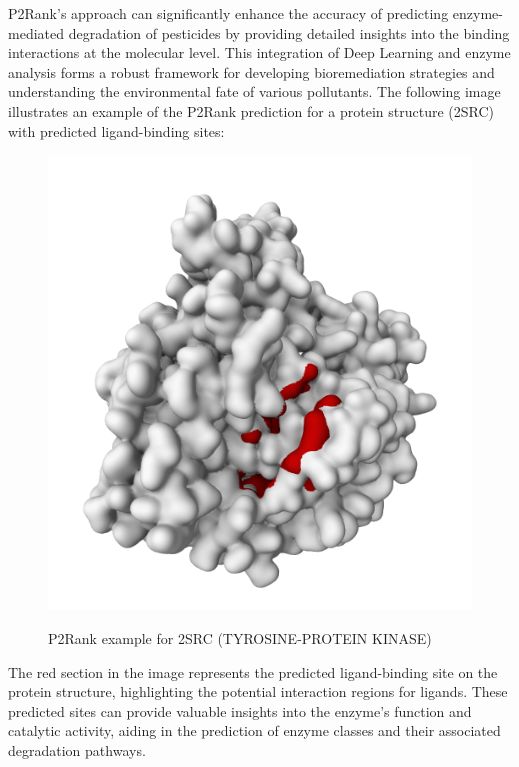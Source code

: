 P2Rank's approach can significantly enhance the accuracy of predicting enzyme-mediated degradation of pesticides by providing detailed insights into the binding interactions at the molecular level. This integration of Deep Learning and enzyme analysis forms a robust framework for developing bioremediation strategies and understanding the environmental fate of various pollutants. \autocite{krivakP2RankMachineLearning2018}
The following image illustrates an example of the P2Rank prediction for a protein structure (2SRC) with predicted ligand-binding sites:

\begin{figure}[hbt]
    \centering
    \begin{minipage}[t]{.5\textwidth}
    \caption{P2Rank example for 2SRC (TYROSINE-PROTEIN KINASE)}
    \includegraphics[width=1\textwidth]{img/p2rank-example.png}\\
    \label{fig:p2rank-example}
    \end{minipage}
\end{figure}

The red section in the image represents the predicted ligand-binding site on the protein structure, highlighting the potential interaction regions for ligands. These predicted sites can provide valuable insights into the enzyme's function and catalytic activity, aiding in the prediction of enzyme classes and their associated degradation pathways.

